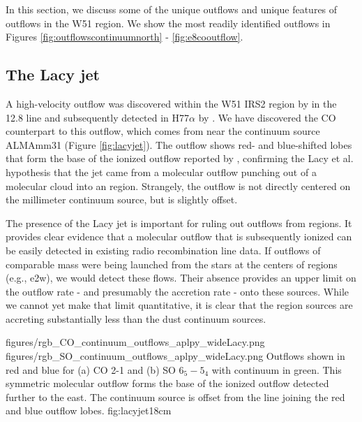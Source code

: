 \documentclass[twocolumn]{aastex61}
\begin{document}
In this section, we discuss some of the unique outflows and unique features of
outflows in the W51 region.  We show the most readily identified outflows in
Figures \ref{fig:outflowscontinuumnorth} - \ref{fig:e8cooutflow}.

\subsection{The Lacy jet}
\label{sec:lacyjet}
A high-velocity outflow was discovered within the W51 IRS2 region by
\citet{Lacy2007a} in the 12.8 \um [Ne II] line and subsequently detected in
H77$\alpha$ by \citet{Ginsburg2016b}.  We have discovered the CO counterpart to
this
outflow, which comes from near the continuum source ALMAmm31 (Figure
\ref{fig:lacyjet}).
The outflow shows red- and blue-shifted lobes
that form the base of the ionized outflow reported by \citet[][Figure
\ref{fig:outflowscontinuumnorth}]{Lacy2007a},
confirming the Lacy et al. hypothesis that the jet came
from a molecular outflow punching out of a molecular cloud into an \hii region.
Strangely, the outflow is not directly centered on the millimeter continuum
source, but is slightly offset.  

The presence of the Lacy jet is important for ruling out outflows from \hii
regions.  It provides clear evidence that a molecular outflow that is
subsequently ionized can be easily detected in existing radio recombination
line data.  If outflows of comparable mass were being launched from the stars
at the centers of \hchii regions (e.g., e2w), we would detect these flows.
Their absence provides an upper limit on the outflow rate - and presumably the
accretion rate - onto these sources.  While we cannot yet make that limit
quantitative, it is clear that the \hchii region sources are accreting
substantially less than the dust continuum sources.



\FigureTwo
{figures/rgb_CO_continuum_outflows_aplpy_wideLacy.png}
{figures/rgb_SO_continuum_outflows_aplpy_wideLacy.png}
{Outflows shown in red and blue for (a) CO 2-1 and (b) SO $6_5-5_4$ with
continuum in green.  This symmetric molecular outflow forms the base of the
\citet{Lacy2007a} ionized outflow detected further to the east.
The continuum source is offset from the line joining the red and blue outflow lobes.}
{fig:lacyjet}{1}{8cm}
\end{document}
